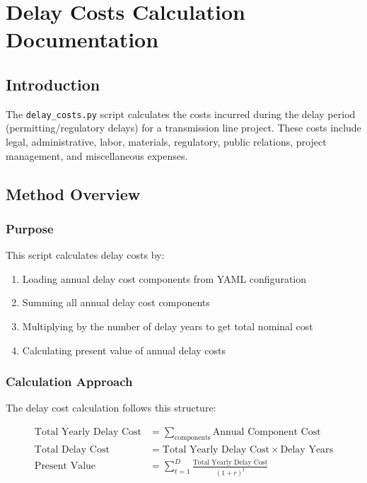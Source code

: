 \documentclass[ctcc_full_documentation.tex]{subfiles}
\begin{document}
\chapter{Delay Costs Calculation Documentation}

\section{Introduction}

The \texttt{delay\_costs.py} script calculates the costs incurred during the delay period (permitting/regulatory delays) for a transmission line project. These costs include legal, administrative, labor, materials, regulatory, public relations, project management, and miscellaneous expenses.

\section{Method Overview}

\subsection{Purpose}

This script calculates delay costs by:
\begin{enumerate}
    \item Loading annual delay cost components from YAML configuration
    \item Summing all annual delay cost components
    \item Multiplying by the number of delay years to get total nominal cost
    \item Calculating present value of annual delay costs
\end{enumerate}

\subsection{Calculation Approach}

The delay cost calculation follows this structure:

\begin{align}
\text{Total Yearly Delay Cost} &= \sum_{\text{components}} \text{Annual Component Cost} \\
\text{Total Delay Cost} &= \text{Total Yearly Delay Cost} \times \text{Delay Years} \\
\text{Present Value} &= \sum_{t=1}^{D} \frac{\text{Total Yearly Delay Cost}}{(1 + r)^t}
\end{align}
\end{document}

